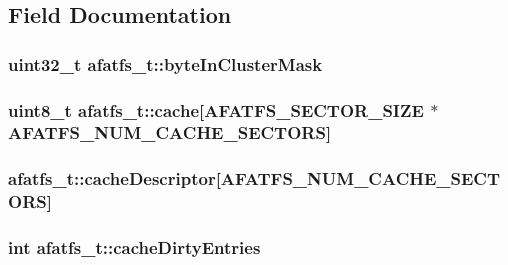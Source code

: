 \subsection{Field Documentation}
\hypertarget{structafatfs__t_a43053a46424b305c37a7cea089ba807a}{
\subsubsection[{byte\+In\+Cluster\+Mask}]{\setlength{\rightskip}{0pt plus 5cm}uint32\+\_\+t afatfs\+\_\+t\+::byte\+In\+Cluster\+Mask}}\label{structafatfs__t_a43053a46424b305c37a7cea089ba807a}
\hypertarget{structafatfs__t_aae478dc8b7a6eee13442e3da698699cb}{
\subsubsection[{cache}]{\setlength{\rightskip}{0pt plus 5cm}uint8\+\_\+t afatfs\+\_\+t\+::cache\mbox{[}{\bf A\+F\+A\+T\+F\+S\+\_\+\+S\+E\+C\+T\+O\+R\+\_\+\+S\+I\+Z\+E} $\ast${\bf A\+F\+A\+T\+F\+S\+\_\+\+N\+U\+M\+\_\+\+C\+A\+C\+H\+E\+\_\+\+S\+E\+C\+T\+O\+R\+S}\mbox{]}}}\label{structafatfs__t_aae478dc8b7a6eee13442e3da698699cb}
\hypertarget{structafatfs__t_a79d527dd25222c814459251af9ebd44a}{
\subsubsection[{cache\+Descriptor}]{ afatfs\+\_\+t\+::cache\+Descriptor\mbox{[}{\bf A\+F\+A\+T\+F\+S\+\_\+\+N\+U\+M\+\_\+\+C\+A\+C\+H\+E\+\_\+\+S\+E\+C\+T\+O\+R\+S}\mbox{]}}}\label{structafatfs__t_a79d527dd25222c814459251af9ebd44a}
\hypertarget{structafatfs__t_a5afafb50df543f56c85b53d2b3aec282}{
\subsubsection[{cache\+Dirty\+Entries}]{\setlength{\rightskip}{0pt plus 5cm}int afatfs\+\_\+t\+::cache\+Dirty\+Entries}}\label{structafatfs__t_a5afafb50df543f56c85b53d2b3aec282}
